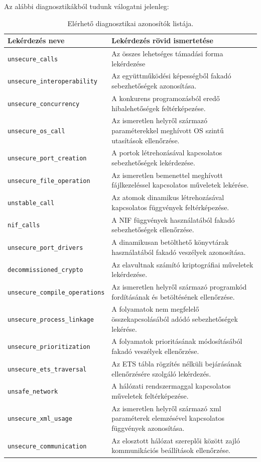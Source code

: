 Az alábbi diagnosztikákból tudunk válogatni jelenleg:

\begin{table}[H]
\centering
\begin{tabular}{|m{}|m{}|}
 \hline
 Lekérdezés neve & Lekérdezés rövid ismertetése \\ [0.5ex] 
 \hline\hline
 \verb|unsecure_calls| & Az összes lehetséges támadási forma lekérdezése \\ \hline
 \verb|unsecure_interoperability| & Az együttműködési képességből fakadó sebezhetőségek azonosítása. \\ \hline
 \verb|unsecure_concurrency| & A konkurens programozásból eredő hibalehetőségek feltérképezése. \\ \hline
 \verb|unsecure_os_call| & Az ismeretlen helyről származó paraméterekkel meghívott OS szintű utasítások ellenőrzése. \\ \hline
 \verb|unsecure_port_creation| & A portok létrehozásával kapcsolatos sebezhetőségek lekérdezése. \\ \hline
 \verb|unsecure_file_operation| & Az ismeretlen bemenettel meghívott fájlkezeléssel kapcsolatos műveletek lekérése. \\ \hline
 \verb|unstable_call| & Az atomok dinamikus létrehozásával kapcsolatos függvények feltérképezése. \\ \hline
 \verb|nif_calls| & A NIF függvények használatából fakadó sebezhetőségek ellenőrzése. \\ \hline
 \verb|unsecure_port_drivers| & A dinamikusan betölthető könyvtárak használatából fakadó veszélyek azonosítása. \\ \hline
 \verb|decommissioned_crypto| & Az elavultnak számító kriptográfiai műveletek lekérdezése. \\ \hline
 \verb|unsecure_compile_operations| & Az ismeretlen helyről származó programkód fordításának és betöltésének ellenőrzése. \\ \hline
 \verb|unsecure_process_linkage| & A folyamatok nem megfelelő összekapcsolásából adódó sebezhetőségek lekérése. \\ \hline
 \verb|unsecure_prioritization| & A folyamatok prioritásának módosításából fakadó veszélyek ellenőrzése. \\ \hline
 \verb|unsecure_ets_traversal| & Az ETS tábla rögzítés nélküli bejárásának ellenőrzésére szolgáló lekérdezés. \\ \hline
 \verb|unsafe_network| & A hálózati rendszermaggal kapcsolatos műveletek feltérképezése. \\ \hline
 \verb|unsecure_xml_usage| & Az ismeretlen helyről származó xml paraméterek elemzésével kapcsolatos függvények azonosítása. \\ \hline
 \verb|unsecure_communication| & Az elosztott hálózat szereplői között zajló kommunikációs beállítások ellenőrzése. \\ [1ex] 
 \hline
\end{tabular}
\caption{Elérhető diagnosztikai azonosítók listája.}
\label{table:1}
\end{table}
